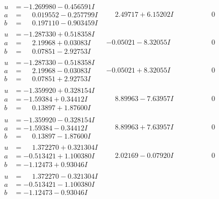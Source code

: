 \documentclass[1p]{elsarticle_modified}
\theoremstyle{definition}
\begin{document}
$$\begin{array}{c|c|c}
 \hline 
\begin{aligned}
u &= -1.269980 - 0.456591 I \\
a &= \phantom{-}0.019552 - 0.257799 I \\
b &= \phantom{-}0.197110 - 0.903459 I\end{aligned}
 & \phantom{-}2.49717 + 6.15202 I & \phantom{-0.000000 } 0 \\ \hline\begin{aligned}
u &= -1.287330 + 0.518358 I \\
a &= \phantom{-}2.19968 + 0.03083 I \\
b &= \phantom{-}0.07851 - 2.92753 I\end{aligned}
 & -0.05021 - 8.32055 I & \phantom{-0.000000 } 0 \\ \hline\begin{aligned}
u &= -1.287330 - 0.518358 I \\
a &= \phantom{-}2.19968 - 0.03083 I \\
b &= \phantom{-}0.07851 + 2.92753 I\end{aligned}
 & -0.05021 + 8.32055 I & \phantom{-0.000000 } 0 \\ \hline\begin{aligned}
u &= -1.359920 + 0.328154 I \\
a &= -1.59384 + 0.34412 I \\
b &= \phantom{-}0.13897 + 1.87600 I\end{aligned}
 & \phantom{-}8.89963 - 7.63957 I & \phantom{-0.000000 } 0 \\ \hline\begin{aligned}
u &= -1.359920 - 0.328154 I \\
a &= -1.59384 - 0.34412 I \\
b &= \phantom{-}0.13897 - 1.87600 I\end{aligned}
 & \phantom{-}8.89963 + 7.63957 I & \phantom{-0.000000 } 0 \\ \hline\begin{aligned}
u &= \phantom{-}1.372270 + 0.321304 I \\
a &= -0.513421 + 1.100380 I \\
b &= -1.12473 + 0.93046 I\end{aligned}
 & \phantom{-}2.02169 - 0.07920 I & \phantom{-0.000000 } 0 \\ \hline\begin{aligned}
u &= \phantom{-}1.372270 - 0.321304 I \\
a &= -0.513421 - 1.100380 I \\
b &= -1.12473 - 0.93046 I\end{aligned}

\end{array}$$
\end{document}
